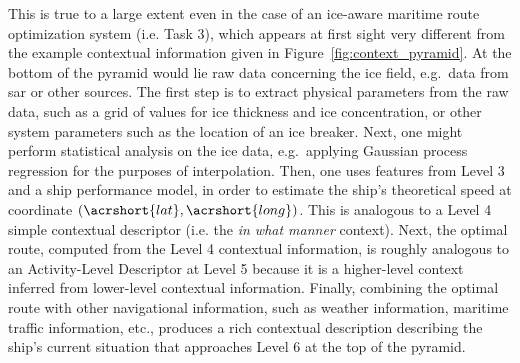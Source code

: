 This is true to a large extent even in the case of an ice-aware maritime route optimization system (i.e. Task 3), which appears at first sight very different from the example contextual information given in Figure~\ref{fig:context_pyramid}. At the bottom of the pyramid would lie raw data concerning the ice field, e.g.\ data from \gls{sar} or other sources. The first step is to extract physical parameters from the raw data, such as a grid of values for ice thickness and ice concentration, or other system parameters such as the location of an ice breaker. Next, one might perform statistical analysis on the ice data, e.g.\ applying Gaussian process regression for the purposes of interpolation. Then, one uses features from Level 3 and a ship performance model, in order to estimate the ship's theoretical speed at coordinate $(\acrshort{lat}, \acrshort{long})$. This is analogous to a Level 4 simple contextual descriptor (i.e. the \emph{in what manner} context). Next, the optimal route, computed from the Level 4 contextual information, is roughly analogous to an Activity-Level Descriptor at Level 5 because it is a higher-level context inferred from lower-level contextual information. Finally, combining the optimal route with other navigational information, such as weather information, maritime traffic information, etc., produces a rich contextual description describing the ship's current situation that approaches Level 6 at the top of the pyramid.
%
